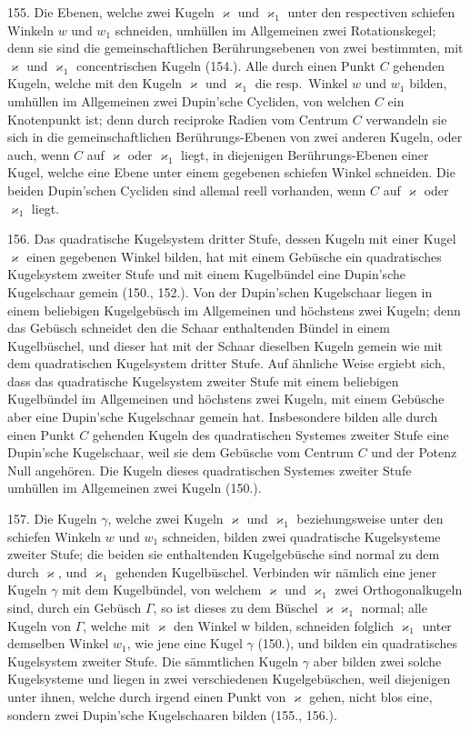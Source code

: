 155. Die Ebenen, welche zwei Kugeln $\varkappa$ und $\varkappa_1$ unter
den respectiven schiefen Winkeln $w$ und $w_1$ schneiden, umh\"ullen
im Allgemeinen zwei Rotationskegel; denn sie sind
die gemeinschaftlichen Ber\"uhrungsebenen von zwei bestimmten,
mit $\varkappa$ und $\varkappa_1$ concentrischen Kugeln (154.). Alle durch
einen Punkt $C$ gehenden Kugeln, welche mit den Kugeln $\varkappa$
und $\varkappa_1$ die resp.\ Winkel $w$ und $w_1$ bilden, umh\"ullen im Allgemeinen
zwei Dupin'sche Cycliden, von welchen $C$ ein Knotenpunkt
ist; denn durch reciproke Radien vom Centrum $C$ verwandeln
sie sich in die gemeinschaftlichen Ber\"uhrungs-Ebenen
von zwei anderen Kugeln, oder auch, wenn $C$ auf $\varkappa$ oder $\varkappa_1$
liegt, in diejenigen Ber\"uhrungs-Ebenen einer Kugel, welche
eine Ebene unter einem gegebenen schiefen Winkel schneiden.
Die beiden Dupin'schen Cycliden sind allemal reell vorhanden,
wenn $C$ auf $\varkappa$ oder $\varkappa_1$ liegt.

156. Das quadratische Kugelsystem dritter Stufe, dessen
Kugeln mit einer Kugel $\varkappa$ einen gegebenen Winkel bilden,
hat mit einem Geb\"usche ein {\glqq}quadratisches Kugelsystem
zweiter Stufe{\grqq} und mit einem Kugelb\"undel eine Dupin'sche
Kugelschaar gemein (150., 152.). Von der Dupin'schen Kugelschaar
liegen in einem beliebigen Kugelgeb\"usch im Allgemeinen
und h\"och\-stens zwei Kugeln; denn das Geb\"usch schneidet
den die Schaar enthaltenden B\"undel in einem Kugelb\"uschel,
und dieser hat mit der Schaar dieselben Kugeln
gemein wie mit dem quadratischen Kugelsystem dritter Stufe.
Auf \"ahnliche Weise ergiebt sich, dass das quadratische Kugelsystem
zweiter Stufe mit einem beliebigen Kugelb\"undel im
Allgemeinen und h\"ochstens zwei Kugeln, mit einem Geb\"usche
aber eine Dupin'sche Kugelschaar gemein hat. Insbesondere
bilden alle durch einen Punkt $C$ gehenden Kugeln des quadratischen
Systemes zweiter Stufe eine Dupin'sche Kugelschaar,
weil sie dem Geb\"usche vom Centrum $C$ und der Potenz Null
angeh\"oren. Die Kugeln dieses quadratischen Systemes zweiter
Stufe umh\"ullen im Allgemeinen zwei Kugeln (150.).

157. Die Kugeln $\gamma$, welche zwei Kugeln $\varkappa$ und $\varkappa_1$ beziehungsweise
unter den schiefen Winkeln $w$ und $w_1$ schneiden,
bilden zwei quadratische Kugelsysteme zweiter Stufe;
die beiden sie enthaltenden Kugelgeb\"usche sind normal zu
dem durch $\varkappa$, und $\varkappa_1$ gehenden Kugelb\"uschel. Verbinden wir
n\"amlich eine jener Kugeln $\gamma$ mit dem Kugelb\"undel, von welchem
$\varkappa$ und $\varkappa_1$ zwei Orthogonalkugeln sind, durch ein Geb\"usch $\varGamma$,
so ist dieses zu dem B\"uschel $\varkappa\varkappa_1$ normal; alle Kugeln von $\varGamma$,
welche mit $\varkappa$ den Winkel w bilden, schneiden folglich $\varkappa_1$
unter demselben Winkel $w_1$, wie jene eine Kugel $\gamma$ (150.),
und bilden ein quadratisches Kugelsystem zweiter Stufe. Die
s\"ammtlichen Kugeln $\gamma$ aber bilden zwei solche Kugelsysteme
und liegen in zwei verschiedenen Kugelgeb\"uschen, weil diejenigen
unter ihnen, welche durch irgend einen Punkt von $\varkappa$
gehen, nicht blos eine, sondern zwei Dupin'sche Kugelschaaren
bilden (155., 156.).


